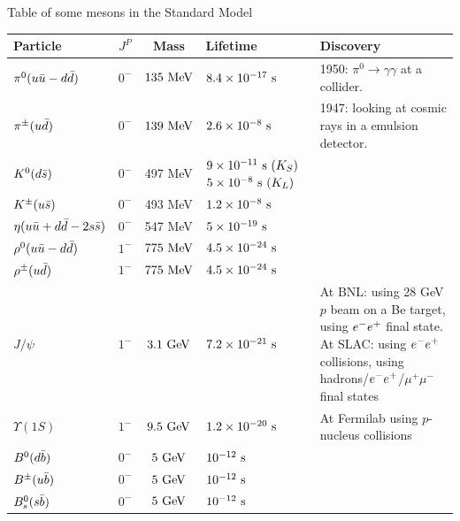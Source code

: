 \begin{table}
\begin{center}
Table of some mesons in the Standard Model \\
\def\arraystretch{1.5}
\begin{tabular}{|l||c|c|p{}|p{}|}
\hline
Particle & $J^P$ & Mass & Lifetime & Discovery\\
\hline
\hline
$\pi^0 (u\bar{u}-d\bar{d})$ & $0^-$ & $135~\text{MeV}$ & $8.4\times 10^{-17}~\text{s}$ & 1950: $\pi^0\rightarrow\gamma\gamma$ at a collider. \\ \hline
$\pi^\pm (u\bar{d})$ & $0^-$  & $139~\text{MeV}$ & $2.6 \times 10^{-8}~\text{s}$ & 1947: looking at cosmic rays in a emulsion detector. \\ \hline
$K^0(d\bar{s})$ & $0^-$  & 497 MeV & $9\times 10^{-11}~\text{s}~(K_S)$\newline$5\times 10^{-8}~\text{s}~(K_L)$ &  \\ \hline
$K^\pm(u\bar{s})$ & $0^-$  & 493 MeV & $1.2\times 10^{-8}~\text{s}$ & \\ \hline
$\eta(u\bar{u}+d\bar{d}-2s\bar{s})$ & $0^-$  &547 MeV& $5\times 10^{-19}~\text{s}$ & \\ \hline
$\rho^0(u\bar{u}-d\bar{d})$ & $1^-$  &$775~\text{MeV}$&$4.5\times10^{-24}~\text{s}$& \\ \hline
$\rho^\pm(u\bar{d})$ & $1^-$  &$775~\text{MeV}$&$4.5\times10^{-24}~\text{s}$& \\ \hline
$J/\psi$ & $1^-$ &$3.1~\text{GeV}$&$7.2\times 10^{-21}~\text{s}$& At BNL: using 28 GeV $p$ beam on a Be target, using $e^{-}e^{+}$ final state. \newline At SLAC: using $e^{-}e^{+}$ collisions, using hadrons/$e^{-}e^{+}$/$\mu^+\mu^-$ final states\\ \hline
$\Upsilon(1S)$ & $1^-$ & $9.5~\text{GeV}$ &$1.2\times10^{-20}~\text{s}$& At Fermilab using $p$-nucleus collisions \\ \hline
$B^0(d\bar{b})$ & $0^-$ & $5~\text{GeV}$ &$10^{-12}~\text{s}$&  \\ \hline
$B^\pm(u\bar{b})$ & $0^-$ & $5~\text{GeV}$ &$10^{-12}~\text{s}$&  \\ \hline
$B^0_s(s\bar{b})$ & $0^-$ & $5~\text{GeV}$ &$10^{-12}~\text{s}$&  \\ \hline
\end{tabular}

\end{center}
\end{table}

\clearpage


